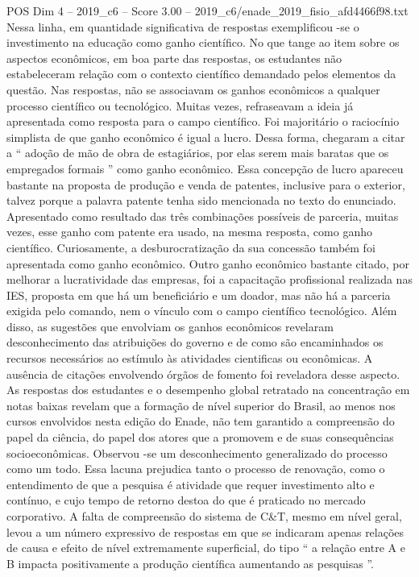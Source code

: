 \begin{textsample}{POS Dim 4 – 2019\_c6 – Score 3.00 – 2019\_c6/enade\_2019\_fisio\_afd4466f98.txt}
Nessa linha, em quantidade significativa de respostas exemplificou -se o investimento na educação como ganho científico.
No que tange ao item sobre os aspectos econômicos, em boa parte das respostas, os estudantes não estabeleceram relação com o contexto científico demandado pelos elementos da questão.
Nas respostas, não se associavam os ganhos econômicos a qualquer processo científico ou tecnológico.
Muitas vezes, refraseavam a ideia já apresentada como resposta para o campo científico.
Foi majoritário o raciocínio simplista de que ganho econômico é igual a lucro.
Dessa forma, chegaram a citar a “ adoção de mão de obra de estagiários, por elas serem mais baratas que os empregados formais ” como ganho econômico.
Essa concepção de lucro apareceu bastante na proposta de produção e venda de patentes, inclusive para o exterior, talvez porque a palavra patente tenha sido mencionada no texto do enunciado.
Apresentado como resultado das três combinações possíveis de parceria, muitas vezes, esse ganho com patente era usado, na mesma resposta, como ganho científico.
Curiosamente, a desburocratização da sua concessão também foi apresentada como ganho econômico.
Outro ganho econômico bastante citado, por melhorar a lucratividade das empresas, foi a capacitação profissional realizada nas IES, proposta em que há um beneficiário e um doador, mas não há a parceria exigida pelo comando, nem o vínculo com o campo científico tecnológico.
Além disso, as sugestões que envolviam os ganhos econômicos revelaram desconhecimento das atribuições do governo e de como são encaminhados os recursos necessários ao estímulo às atividades cientificas ou econômicas.
A ausência de citações envolvendo órgãos de fomento foi reveladora desse aspecto.
As respostas dos estudantes e o desempenho global retratado na concentração em notas baixas revelam que a formação de nível superior do Brasil, ao menos nos cursos envolvidos nesta edição do Enade, não tem garantido a compreensão do papel da ciência, do papel dos atores que a promovem e de suas consequências socioeconômicas.
Observou -se um desconhecimento generalizado do processo como um todo.
Essa lacuna prejudica tanto o processo de renovação, como o entendimento de que a pesquisa é atividade que requer investimento alto e contínuo, e cujo tempo de retorno destoa do que é praticado no mercado corporativo.
A falta de compreensão do sistema de C\&T, mesmo em nível geral, levou a um número expressivo de respostas em que se indicaram apenas relações de causa e efeito de nível extremamente superficial, do tipo “ a relação entre A e B impacta positivamente a produção científica aumentando as pesquisas ”.

\end{textsample}
